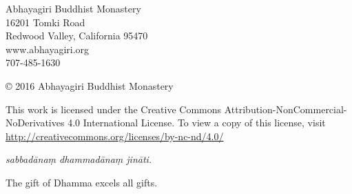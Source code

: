 \thispagestyle{empty}
{\raggedright
{}
\noindent Abhayagiri Buddhist Monastery\\
16201 Tomki Road\\
Redwood Valley, California 95470\\
www.abhayagiri.org\\
707-485-1630

\vspace{1em}
\noindent © 2016 Abhayagiri Buddhist Monastery

\vspace{1em}
\noindent This work is licensed under the Creative Commons
Attribution-NonCommercial-NoDerivatives 4.0 International License.
To view a copy of this license, visit\\
\href{http://creativecommons.org/licenses/by-nc-nd/4.0}
{http://creativecommons.org/licenses/by-nc-nd/4.0/}

\vspace{1em}
\noindent \emph{sabbadānaṃ dhammadānaṃ jināti.}

\vspace{1em}
\noindent The gift of Dhamma excels all gifts.

}
\clearpage
